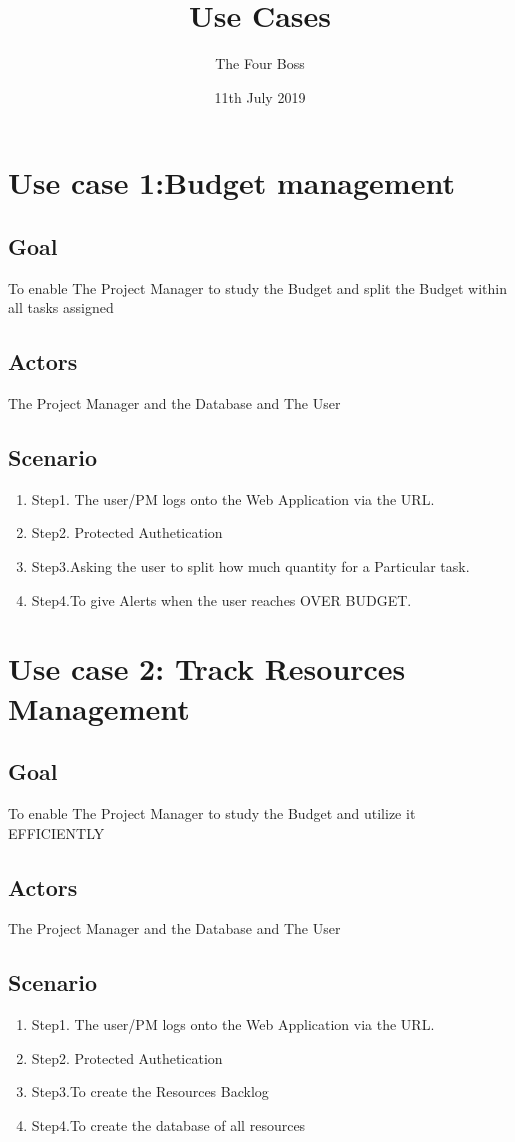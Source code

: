 \documentclass[10pt]{article}
\title{Use Cases}
\author{The Four Boss}
\date{ 11th July 2019}
\begin{document}
\maketitle
\tableofcontents
\section*{Use case 1:Budget management}
\subsection{Goal}
To enable The Project Manager to study the Budget and split the Budget within all tasks assigned
\subsection{Actors}
The Project Manager and the Database and The User 
\subsection{Scenario}
\begin{enumerate}
\item Step1. The user/PM logs onto the Web Application via the URL.
\item Step2. Protected Authetication
\item Step3.Asking the user to split how much quantity for a Particular task.
\item Step4.To give Alerts when the user reaches OVER BUDGET.
\end{enumerate}


\section*{Use case 2: Track Resources Management}
\subsection{Goal}
To enable The Project Manager to study the Budget and utilize it EFFICIENTLY
\subsection{Actors}
The Project Manager and the Database and The User 
\subsection{Scenario}
\begin{enumerate}
\item Step1. The user/PM logs onto the Web Application via the URL.
\item Step2. Protected Authetication
\item Step3.To create the Resources Backlog
\item Step4.To create the database of all resources 
\end{enumerate}
\end{document}
